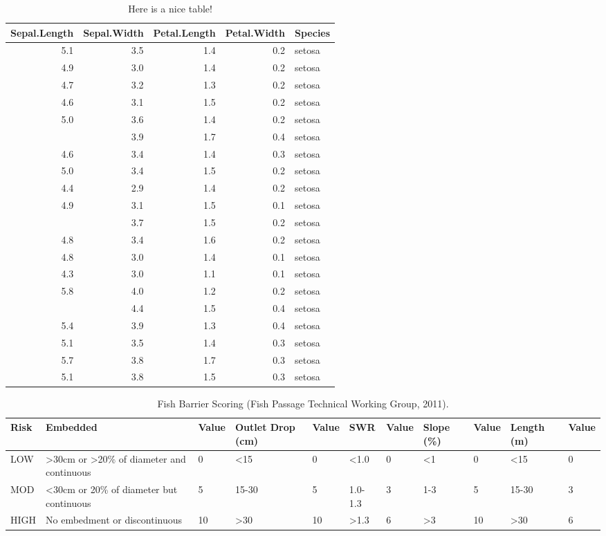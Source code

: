 \documentclass[
]{book}
\begin{document}
\begin{table}

\caption{\label{tab:nice-tab}Here is a nice table!}
\centering
\begin{tabular}[t]{rrrrl}
\toprule
Sepal.Length & Sepal.Width & Petal.Length & Petal.Width & Species\\
\midrule
5.1 & 3.5 & 1.4 & 0.2 & setosa\\
4.9 & 3.0 & 1.4 & 0.2 & setosa\\
4.7 & 3.2 & 1.3 & 0.2 & setosa\\
4.6 & 3.1 & 1.5 & 0.2 & setosa\\
5.0 & 3.6 & 1.4 & 0.2 & setosa\\
\addlinespace
5.4 & 3.9 & 1.7 & 0.4 & setosa\\
4.6 & 3.4 & 1.4 & 0.3 & setosa\\
5.0 & 3.4 & 1.5 & 0.2 & setosa\\
4.4 & 2.9 & 1.4 & 0.2 & setosa\\
4.9 & 3.1 & 1.5 & 0.1 & setosa\\
\addlinespace
5.4 & 3.7 & 1.5 & 0.2 & setosa\\
4.8 & 3.4 & 1.6 & 0.2 & setosa\\
4.8 & 3.0 & 1.4 & 0.1 & setosa\\
4.3 & 3.0 & 1.1 & 0.1 & setosa\\
5.8 & 4.0 & 1.2 & 0.2 & setosa\\
\addlinespace
5.7 & 4.4 & 1.5 & 0.4 & setosa\\
5.4 & 3.9 & 1.3 & 0.4 & setosa\\
5.1 & 3.5 & 1.4 & 0.3 & setosa\\
5.7 & 3.8 & 1.7 & 0.3 & setosa\\
5.1 & 3.8 & 1.5 & 0.3 & setosa\\
\bottomrule
\end{tabular}
\end{table}

\begin{table}

\caption{\label{tab:unnamed-chunk-4}Fish Barrier Scoring (Fish Passage Technical Working Group, 2011).}
\centering
\begin{tabular}[t]{l|l|l|l|l|l|l|l|l|l|l}
\hline
Risk & Embedded & Value & Outlet Drop (cm) & Value & SWR & Value & Slope (\%) & Value & Length (m) & Value\\
\hline
LOW & >30cm or >20\% of diameter and continuous & 0 & <15 & 0 & <1.0 & 0 & <1 & 0 & <15 & 0\\
\hline
MOD & <30cm or 20\% of diameter but continuous & 5 & 15-30 & 5 & 1.0-1.3 & 3 & 1-3 & 5 & 15-30 & 3\\
\hline
HIGH & No embedment or discontinuous & 10 & >30 & 10 & >1.3 & 6 & >3 & 10 & >30 & 6\\
\hline
\end{tabular}
\end{table}
\end{document}
